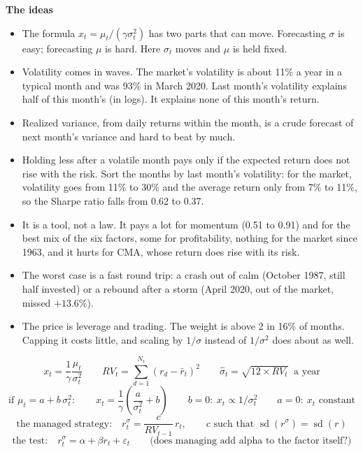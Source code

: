 \documentclass[11pt]{article}
\newcounter{ex}[section]
\newcommand{\head}[1]{\par\medskip\textbf{#1}\par}
\newcommand{\RV}{\mathit{RV}}
\begin{document}
\head{The ideas}
\begin{itemize}
\item The formula $x_{t} = \mu_{t}/(\gamma\sigma_{t}^{2})$ has two parts that can move. Forecasting $\sigma$ is easy;
forecasting $\mu$ is hard. Here $\sigma_{t}$ moves and $\mu$ is held fixed.
\item Volatility comes in waves. The market's volatility is about 11\% a year in a typical month and was 93\% in March
2020. Last month's volatility explains half of this month's (in logs). It explains none of this month's return.
\item Realized variance, from daily returns within the month, is a crude forecast of next month's variance and hard to
beat by much.
\item Holding less after a volatile month pays only if the expected return does not rise with the risk. Sort the months by
last month's volatility: for the market, volatility goes from 11\% to 30\% and the average return only from 7\% to 11\%, so
the Sharpe ratio falls from 0.62 to 0.37.
\item It is a tool, not a law. It pays a lot for momentum (0.51 to 0.91) and for the best mix of the six factors, some
for profitability, nothing for the market since 1963, and it hurts for CMA, whose return does rise with its risk.
\item The worst case is a fast round trip: a crash out of calm (October 1987, still half invested) or a rebound after a
storm (April 2020, out of the market, missed $+13.6\%$).
\item The price is leverage and trading. The weight is above 2 in 16\% of months. Capping it costs little, and scaling by
$1/\sigma$ instead of $1/\sigma^{2}$ does about as well.
\end{itemize}

\begin{keybox}
\[ x_{t} = \frac{1}{\gamma}\frac{\mu_{t}}{\sigma_{t}^{2}} \qquad
   \RV_{t} = \sum_{d=1}^{N_{t}}(r_{d} - \bar r_{t})^{2} \qquad \hat\sigma_{t} = \sqrt{12\times\RV_{t}} \ \text{ a year} \]
\[ \text{if } \mu_{t} = a + b\,\sigma_{t}^{2}:\qquad x_{t} = \frac{1}{\gamma}\left(\frac{a}{\sigma_{t}^{2}} + b\right)
   \qquad b = 0:\ x_{t} \propto 1/\sigma_{t}^{2} \qquad a = 0:\ x_{t} \text{ constant} \]
\[ \text{the managed strategy:}\quad r^{\sigma}_{t} = \frac{c}{\RV_{t-1}}\,r_{t}, \qquad c \text{ such that }
   \operatorname{sd}(r^{\sigma}) = \operatorname{sd}(r) \]
\[ \text{the test:}\quad r^{\sigma}_{t} = \alpha + \beta r_{t} + \varepsilon_{t} \qquad \text{(does managing add alpha to the factor itself?)} \]
\end{keybox}
\end{document}

